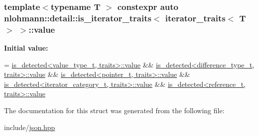 \subsubsection[{\texorpdfstring{value}{value}}]{\setlength{\rightskip}{0pt plus 5cm}template$<$typename T $>$ constexpr auto {\bf nlohmann\+::detail\+::is\+\_\+iterator\+\_\+traits}$<$ {\bf iterator\+\_\+traits}$<$ T $>$ $>$\+::value\hspace{0.3cm}{\ttfamily [static]}}\hypertarget{structnlohmann_1_1detail_1_1is__iterator__traits_3_01iterator__traits_3_01T_01_4_01_4_ac2711760b352b8921accc6609957dc90}{}\label{structnlohmann_1_1detail_1_1is__iterator__traits_3_01iterator__traits_3_01T_01_4_01_4_ac2711760b352b8921accc6609957dc90}
{\bfseries Initial value\+:}
\begin{DoxyCode}
=
        \hyperlink{namespacenlohmann_1_1detail_a2fb6dae6578e06ae73ca0d7cc8512b1aa2063c1608d6e0baf80249c42e2be5804}{is\_detected<value\_type\_t, traits>::value} &&
        \hyperlink{namespacenlohmann_1_1detail_a2fb6dae6578e06ae73ca0d7cc8512b1aa2063c1608d6e0baf80249c42e2be5804}{is\_detected<difference\_type\_t, traits>::value} &&
        \hyperlink{namespacenlohmann_1_1detail_a2fb6dae6578e06ae73ca0d7cc8512b1aa2063c1608d6e0baf80249c42e2be5804}{is\_detected<pointer\_t, traits>::value} &&
        \hyperlink{namespacenlohmann_1_1detail_a2fb6dae6578e06ae73ca0d7cc8512b1aa2063c1608d6e0baf80249c42e2be5804}{is\_detected<iterator\_category\_t, traits>::value} &&
        \hyperlink{namespacenlohmann_1_1detail_a2fb6dae6578e06ae73ca0d7cc8512b1aa2063c1608d6e0baf80249c42e2be5804}{is\_detected<reference\_t, traits>::value}
\end{DoxyCode}


The documentation for this struct was generated from the following file\+:\begin{DoxyCompactItemize}
\item 
include/\hyperlink{json_8hpp}{json.\+hpp}\end{DoxyCompactItemize}

